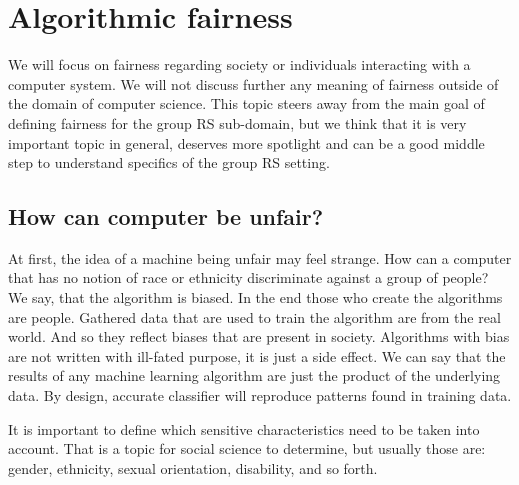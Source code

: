 \section{Algorithmic fairness}\label{subsec:02_general.algorithmic_fairness_and_possible_meanings}
We will focus on fairness regarding society or individuals interacting with a computer system. We will not discuss further any meaning of fairness outside of the domain of computer science. This topic steers away from the main goal of defining fairness for the group RS sub-domain, but we think that it is very important topic in general, deserves more spotlight and can be a good middle step to understand specifics of the group RS setting.

\subsection{How can computer be unfair?}
At first, the idea of a machine being unfair may feel strange. How can a computer that has no notion of race or ethnicity discriminate against a group of people? We say, that the algorithm is biased. In the end those who create the algorithms are people. Gathered data that are used to train the algorithm are from the real world. And so they reflect biases that are present in society. Algorithms with bias are not written with ill-fated purpose, it is just a side effect. We can say that the results of any machine learning algorithm are just the product of the underlying data. By design, accurate classifier will reproduce patterns found in training data.

It is important to define which sensitive characteristics need to be taken into account. That is a topic for social science to determine, but usually those are: gender, ethnicity, sexual orientation, disability, and so forth.

